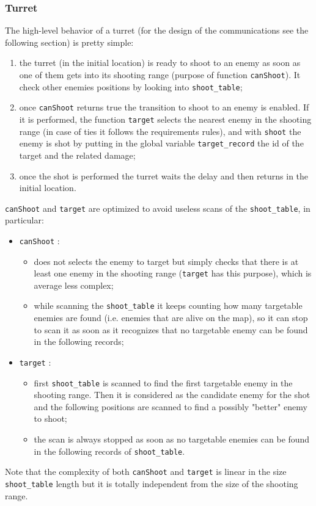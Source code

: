 \documentclass[
10pt, %
a4paper, %
oneside, %
headinclude,footinclude, %
BCOR5mm, %
]{scrartcl}
\begin{document}
			\subsubsection{Turret}
				The high-level behavior of a turret (for the design of the communications see the following section) is pretty simple:
				\begin{enumerate}
					\item the turret (in the initial location) is ready to shoot to an enemy as soon as one of them gets into its shooting range (purpose of function \texttt{canShoot}). It check other enemies positions by looking into \texttt{shoot\_table};
					\item once \texttt{canShoot} returns true the transition to shoot to an enemy is enabled. If it is performed, the function \texttt{target} selects the nearest enemy in the shooting range (in case of ties it follows the requirements rules), and with \texttt{shoot} the enemy is shot by putting in the global variable \texttt{target\_record} the id of the target and the related damage;
					\item once the shot is performed the turret waits the delay and then returns in the initial location.
				\end{enumerate}
				\texttt{canShoot} and \texttt{target} are optimized to avoid useless scans of the \texttt{shoot\_table}, in particular:
				\begin{itemize}
					\item \texttt{canShoot} :
						\begin{itemize}
							\item does not selects the enemy to target but simply checks that there is at least one enemy in the shooting range (\texttt{target} has this purpose), which is average less complex;
							\item while scanning the \texttt{shoot\_table} it keeps counting how many targetable enemies are found (i.e. enemies that are alive on the map), so it can stop to scan it as soon as it recognizes that no targetable enemy can be found in the following records;
						\end{itemize}
					\item \texttt{target} :
						\begin{itemize}
							\item first \texttt{shoot\_table} is scanned to find the first targetable enemy in the shooting range. Then it is considered as the candidate enemy for the shot and the following positions are scanned to find a possibly "better" enemy to shoot;
							\item the scan is always stopped as soon as no targetable enemies can be found in the following records of \texttt{shoot\_table}.
						\end{itemize}
				\end{itemize}
				Note that the complexity of both \texttt{canShoot} and \texttt{target} is linear in the size \texttt{shoot\_table} length but it is totally independent from the size of the shooting range.
				
\end{document}
